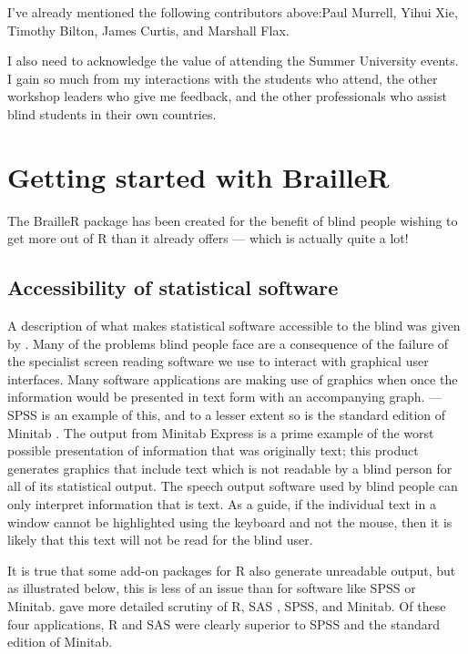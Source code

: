 \documentclass[
]{book}
\begin{document}
I've already mentioned the following contributors above:Paul Murrell, Yihui Xie, Timothy Bilton, James Curtis, and Marshall Flax.

I also need to acknowledge the value of attending the Summer University events. I gain so much from my interactions with the students who attend, the other workshop leaders who give me feedback, and the other professionals who assist blind students in their own countries.

\hypertarget{GettingStarted}{%
\chapter{Getting started with BrailleR}\label{GettingStarted}}

The BrailleR package has been created for the benefit of blind people wishing to
get more out of R than it already offers --- which is actually quite a
lot!

\hypertarget{accessibility-of-statistical-software}{%
\section{Accessibility of statistical software}\label{accessibility-of-statistical-software}}

A description of what makes statistical software accessible to the blind was given by \citep{GodfreyLoots2014JSS}. Many of the problems blind people face are a consequence of the failure of the specialist screen reading software we use to interact with graphical user interfaces.
Many software applications are making use of graphics when once the information would be presented in text form with an accompanying graph. --- SPSS \citep{SPSS-Soft} is an example of this, and to a lesser extent so is the standard edition of Minitab \citep{Minitab-Soft}. The output from Minitab Express \citep{Minitab-Express} is a prime example of the worst possible presentation of information that was originally text; this product generates graphics that include text which is not readable by a blind person for all of its statistical output. The speech output software used by blind people can only interpret information that is text. As a guide, if the individual text in a window cannot be highlighted using the keyboard and not the mouse, then it is likely that this text will not be read for the blind user.

It is true that some add-on packages for R also generate unreadable output, but as illustrated below, this is less of an issue than for software like SPSS or Minitab.
\citep{GodfreyLoots2014JSS} gave more detailed scrutiny of R, SAS \citep{SAS-Soft} , SPSS, and Minitab. Of these four applications, R and SAS were clearly superior to SPSS and the standard edition of Minitab.
\end{document}
